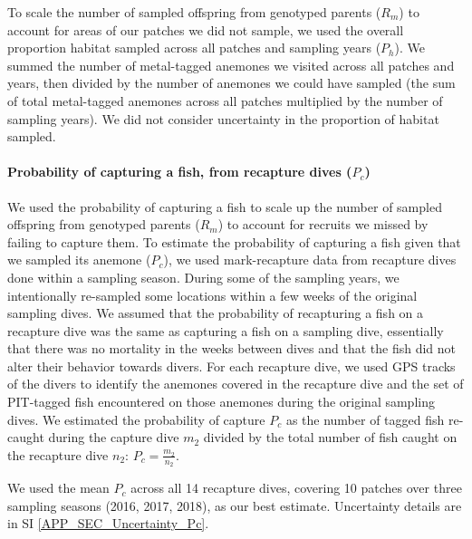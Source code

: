 \documentclass[12pt, oneside]{article}   	%
\begin{document}
To scale the number of sampled offspring from genotyped parents ($R_m$) to account for areas of our patches we did not sample, we used the overall proportion habitat sampled across all patches and sampling years ($P_h$). We summed the number of metal-tagged anemones we visited across all patches and years, then divided by the number of anemones we could have sampled (the sum of total metal-tagged anemones across all patches multiplied by the number of sampling years). We did not consider uncertainty in the proportion of habitat sampled.

\paragraph{Probability of capturing a fish, from recapture dives ($P_c$)} \label{APP_SEC_ProbR}

We used the probability of capturing a fish to scale up the number of sampled offspring from genotyped parents ($R_m$) to account for recruits we missed by failing to capture them. To estimate the probability of capturing a fish given that we sampled its anemone ($P_c$), we used mark-recapture data from recapture dives done within a sampling season. During some of the sampling years, we intentionally re-sampled some locations within a few weeks of the original sampling dives. We assumed that the probability of recapturing a fish on a recapture dive was the same as capturing a fish on a sampling dive, essentially that there was no mortality in the weeks between dives and that the fish did not alter their behavior towards divers. For each recapture dive, we used GPS tracks of the divers to identify the anemones covered in the recapture dive and the set of PIT-tagged fish encountered on those anemones during the original sampling dives. We estimated the probability of capture $P_c$ as the number of tagged fish re-caught during the capture dive $m_2$ divided by the total number of fish caught on the recapture dive $n_2$: $P_c = \frac{m_2}{n_2}$. %

We used the mean $P_c$ across all 14 recapture dives, covering 10 patches over three sampling seasons (2016, 2017, 2018), as our best estimate. Uncertainty details are in SI \ref{APP_SEC_Uncertainty_Pc}.

\end{document}

